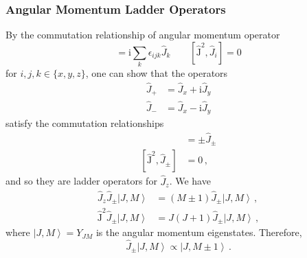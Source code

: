 \documentclass{article}
\theoremstyle{plain}\theoremheaderfont{\normalfont\itshape}\theorembodyfont{\rmfamily}\theoremseparator{.}\newtheorem*{rem}{Remark}\newtheorem*{ex}{Example}\newtheorem*{proof}{Proof}\newtheorem*{altp}{Alternative proof}
\theoremstyle{plain}\theoremheaderfont{\normalfont\bfseries}\theorembodyfont{\rmfamily}\theoremseparator{.}\newtheorem{thm}{Theorem}[section]\newtheorem{lem}[thm]{Lemma}\newtheorem{prop}[thm]{Proposition}\newtheorem*{cor}{Corollary}\newtheorem{defn}[thm]{Definition}\newtheorem{clm}[thm]{Claim}\newtheorem{clminproof}{Claim}
\theoremstyle{break}\theoremheaderfont{\normalfont\itshape}\theorembodyfont{\rmfamily}\theoremseparator{.\medskip}\newtheorem*{proofskip}{Proof}\newtheorem*{exs}{Examples}\newtheorem*{rems}{Remarks}
\theoremstyle{break}\theoremheaderfont{\normalfont\bfseries}\theorembodyfont{\rmfamily}\theoremseparator{.\medskip}\newtheorem{lemskip}[thm]{Lemma}\newtheorem{defnskip}[thm]{Definition}\newtheorem{propskip}[thm]{Proposition}\newtheorem{thmskip}[thm]{Theorem}
\numberwithin{equation}{section}
\newcommand{\ii}{\mathrm{i}}
\newcommand{\ket}[1]{\left| #1 \right\rangle}
\newcommand{\vb}[1]{\bm{\mathrm{#1}}}
\begin{document}
    \subsubsection{Angular Momentum Ladder Operators}
    By the commutation relationship of angular momentum operator
    \begin{equation}
        [\hat{J}_i,\hat{J}_j]=\ii\sum_k\epsilon_{ijk}\hat{J}_k\qquad [\hat{\vb{J}}^2,\hat{J}_i]=0
    \end{equation}
    for \(i,j,k\in\{x,y,z\}\), one can show that the operators
    \begin{align}
        \hat{J}_+&=\hat{J}_x+\ii\hat{J}_y\\
        \hat{J}_-&=\hat{J}_x-\ii\hat{J}_y
    \end{align}
    satisfy the commutation relationships
    \begin{align}
        [\hat{J}_z,\hat{J}_\pm]&=\pm\hat{J}_\pm \\
        [\hat{\vb{J}}^2,\hat{J}_\pm]&=0\,,
    \end{align}
    and so they are ladder operators for \(\hat{J}_z\). We have
    \begin{align}
        \hat{J}_z\hat{J}_{\pm}\ket{J,M}&=(M\pm 1)\hat{J}_{\pm}\ket{J,M}\,,\\
        \hat{\vb{J}}^2\hat{J}_{\pm}\ket{J,M}&=J(J+1)\hat{J}_{\pm}\ket{J,M}\,,
    \end{align}
    where \(\ket{J,M}=Y_{JM}\) is the angular momentum eigenstates. Therefore,
    \begin{equation}
        \hat{J}_{\pm}\ket{J,M}\propto\ket{J,M\pm 1}\,.
    \end{equation}
\end{document}
